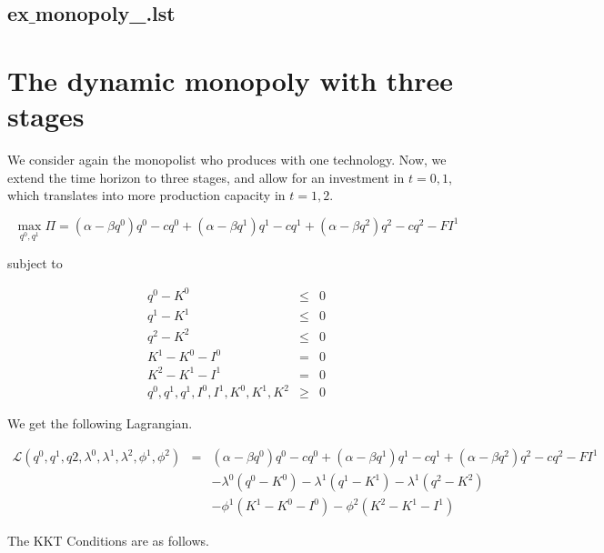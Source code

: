 \documentclass[11pt,a4paper]{article}
\begin{document}


\subsection*{ex$\_$monopoly\_.lst}




\section{The dynamic monopoly with three stages}

We consider again the monopolist who produces with one technology. Now, we extend the time horizon to three stages, and allow for an investment in $t=0,1$, which translates into more production capacity in $t=1,2$.

\begin{equation*}
	\max_{q^0,q^1}\Pi = (\alpha-\beta q^0)q^0 - cq^0 +  (\alpha-\beta q^1)q^1 - cq^1 + (\alpha-\beta q^2)q^2 - cq^2 -FI^1
\end{equation*}

subject to

\begin{eqnarray*}
	q^0 - K^0 &\leq& 0\\
	q^1 - K^1 &\leq& 0\\
	q^2 - K^2 &\leq& 0\\
        K^1 - K^0 - I^0 &=& 0\\
        K^2 - K^1 - I^1 &=& 0\\
	q^0,q^1,q^1, I^0, I^1, K^0, K^1, K^2 &\geq& 0 
\end{eqnarray*}
 
We get the following Lagrangian.

\begin{eqnarray*}
	\mathcal{L}(q^0,q^1,q2,\lambda^0,\lambda^1,\lambda^2,\phi^1,\phi^2)&=& (\alpha-\beta q^0)q^0 - cq^0 +  (\alpha-\beta q^1)q^1 - cq^1 +  (\alpha-\beta q^2)q^2 - cq^2-FI^1 \\
        && - \lambda^0(q^0-K^0) - \lambda^1(q^1-K^1) - \lambda^1(q^2-K^2) \\
&& - \phi^1(K^1-K^0-I^0) - \phi^2(K^2-K^1-I^1)
\end{eqnarray*}

The KKT Conditions are as follows.
\end{document}
